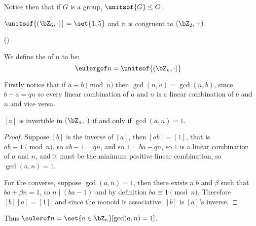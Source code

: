 \documentclass[10pt]{article}
\let\divides=\mid
\begin{document}
Notice then that if $G$ is a group, $\unitsof{G}\leq G$.

\begin{exam}

    $\unitsof{(\bZ_6,\cdot)} = \set{1,5}$ and it is congruent to $(\bZ_2,+)$.

\end{exam}

({})
\begin{defn*}

    We define the  of $n$ to be:
        \[ \eulergof n = \unitsof{(\bZ_n,\cdot)} \]

\end{defn*}

Firstly notice that if $a\equiv b\pmod n$ then $\gcd(n,a)=\gcd(n,b)$, since $b-a=qn$ so every linear combination of $a$ and $n$ is a linear combination of $b$ and $n$ and
vice versa.

\begin{prop*}

    $[a]$ is invertible in $(\bZ_n,\cdot)$ if and only if $\gcd(a,n)=1$.

\end{prop*}

\begin{proof}

    Suppose $[b]$ is the inverse of $[a]$, then $[ab]=[1]$, that is $ab\equiv 1\pmod n$, so $ab-1=qn$, and so $1=ba-qn$, so $1$ is a linear combination of $a$ and $n$, and
    it must be the minimum positive linear combination, so $\gcd(a,n)=1$.

    For the converse, suppose $\gcd(a,n)=1$, then there exists a $b$ and $\beta$ such that $ba+\beta n=1$, so $n\divides (ba-1)$ and by definition $ba\equiv 1\pmod n$.
    Therefore $[b][a]=[1]$, and since the monoid is associative, $[b]$ is $[a]$'s inverse.

\end{proof}

Thus $\eulerof n=\set{a\in\bZ_n}[\gcd(a,n)=1]$.
\end{document}
